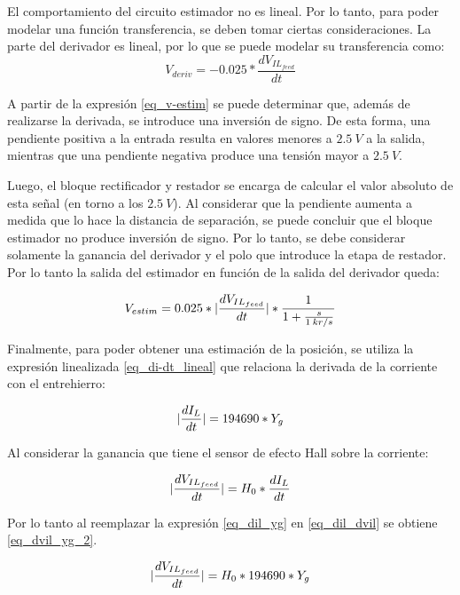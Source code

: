 El comportamiento del circuito estimador no es lineal.  Por lo tanto, para poder modelar una función transferencia, se deben tomar ciertas consideraciones. La parte del derivador es lineal, por lo que se puede modelar su transferencia como:
\begin{equation}\label{eq_v-estim}
	V_{deriv}=-0.025*\frac{dV_{IL_{feed}}}{dt} 
\end{equation}

A partir de la expresión \ref{eq_v-estim} se puede determinar que, además de realizarse la derivada, se introduce una inversión de signo. De esta forma, una pendiente positiva a la entrada resulta en valores menores a $2.5\:V$ a la salida, mientras que una pendiente negativa produce una tensión mayor a $2.5\:V$.

Luego, el bloque rectificador y restador se encarga de calcular el valor absoluto de esta señal (en torno a los $2.5\:V$). Al considerar que la pendiente aumenta a medida que lo hace la distancia de separación, se puede concluir que el bloque estimador no produce inversión de signo. Por lo tanto, se debe considerar solamente la ganancia del derivador y el polo que introduce la etapa de restador. Por lo tanto la salida del estimador en función de la salida del derivador queda:

\begin{equation} \label{eq_vestim_dvil}
	V_{estim}=0.025*\lvert\frac{dV_{IL_{feed}}}{dt}\rvert*\frac{1}{1+\frac{s}{1\:kr/s}} 
\end{equation}


Finalmente, para poder obtener una estimación de la posición, se utiliza la expresión linealizada \ref{eq_di-dt_lineal} que relaciona la derivada de la corriente con el entrehierro:

\begin{equation} \label{eq_dil_yg}
	\lvert\frac{dI_{L}}{dt}\rvert = 194690 * Y_{g}
\end{equation}


Al considerar la ganancia que tiene el sensor de efecto Hall sobre la corriente:

\begin{equation} \label{eq_dil_dvil}
	\lvert\frac{dV_{IL_{feed}}}{dt}\rvert= H_0*\frac{dI_{L}}{dt} 
\end{equation}

Por lo tanto al reemplazar la expresión \ref{eq_dil_yg} en \ref{eq_dil_dvil} se obtiene \ref{eq_dvil_yg_2}.

\begin{equation} \label{eq_dvil_yg_2}
	\lvert\frac{dV_{IL_{feed}}}{dt}\rvert = H_0*194690*Y_{g}
\end{equation}

